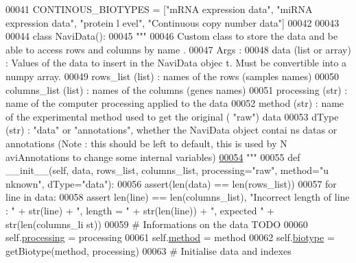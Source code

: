 \begin{DoxyCode}
00041 CONTINOUS\_BIOTYPES = [\textcolor{stringliteral}{"mRNA expression data"}, \textcolor{stringliteral}{"miRNA expression data"}, \textcolor{stringliteral}{"protein l
      evel"}, \textcolor{stringliteral}{"Continuous copy number data"}]
00042 
00043 
00044 \textcolor{keyword}{class }NaviData():
00045     \textcolor{stringliteral}{"""}
00046 \textcolor{stringliteral}{    Custom class to store the data and be able to access rows and columns by name
      .}
00047 \textcolor{stringliteral}{    Args :}
00048 \textcolor{stringliteral}{        data (list or array) : Values of the data to insert in the NaviData objec
      t. Must be convertible into a numpy array.}
00049 \textcolor{stringliteral}{        rows\_list (list) : names of the rows (samples names)}
00050 \textcolor{stringliteral}{        columns\_list (list) : names of the columns (genes names)}
00051 \textcolor{stringliteral}{        processing (str) : name of the computer processing applied to the data}
00052 \textcolor{stringliteral}{        method (str) : name of the experimental method used to get the original (
      "raw") data}
00053 \textcolor{stringliteral}{        dType (str) : "data" or "annotations", whether the NaviData object contai
      ns datas or annotations (Note : this should be left to default, this is used by N
      aviAnnotations to change some internal variables)}
\hypertarget{navidata_8py_source_l00054}{}\hyperlink{classnavicom_1_1navidata_1_1NaviData}{00054} \textcolor{stringliteral}{    """}
00055     \textcolor{keyword}{def }\_\_init\_\_(self, data, rows\_list, columns\_list, processing="raw", method="u
      nknown", dType="data"):
00056         \textcolor{keyword}{assert}(len(data) == len(rows\_list))
00057         \textcolor{keywordflow}{for} line \textcolor{keywordflow}{in} data:
00058             \textcolor{keyword}{assert} len(line) == len(columns\_list), \textcolor{stringliteral}{"Incorrect length of line : "} 
      + str(line) + \textcolor{stringliteral}{", length = "} + str(len(line)) + \textcolor{stringliteral}{", expected "} + str(len(columns\_li
      st))
00059         \textcolor{comment}{# Informations on the data TODO}
00060         self.\hyperlink{classnavicom_1_1navidata_1_1NaviData_ab3f30d76377459fe539f440df162ea59}{processing} = processing
00061         self.\hyperlink{classnavicom_1_1navidata_1_1NaviData_ae8f909ed788b49a3c894251957e2f732}{method} = method
00062         self.\hyperlink{classnavicom_1_1navidata_1_1NaviData_a863ac9998d2facd5f86bcea9b6256003}{biotype} = getBiotype(method, processing)
00063         \textcolor{comment}{# Initialise data and indexes}

\end{DoxyCode}
